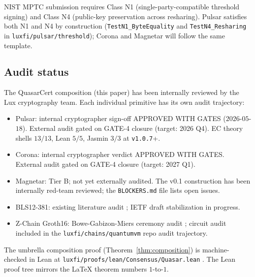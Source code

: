 NIST MPTC submission requires Class N1 (single-party-compatible
threshold signing) and Class N4 (public-key preservation across
resharing). Pulsar satisfies both N1 and N4 by construction
(\texttt{TestN1\_ByteEquality} and \texttt{TestN4\_Resharing} in
\texttt{luxfi/pulsar/threshold}); Corona and Magnetar will follow
the same template.

\subsection{Audit status}

The QuasarCert composition (this paper) has been internally
reviewed by the Lux cryptography team. Each individual primitive
has its own audit trajectory:

\begin{itemize}[leftmargin=2em,nosep]
\item Pulsar: internal cryptographer sign-off APPROVED WITH GATES
      ($2026$-$05$-$18$). External audit gated on GATE-4 closure
      (target: 2026 Q4). EC theory shells $13/13$, Lean $5/5$,
      Jasmin $3/3$ at \texttt{v1.0.7}+.
\item Corona: internal cryptographer verdict APPROVED WITH GATES.
      External audit gated on GATE-4 closure (target: 2027 Q1).
\item Magnetar: Tier B; not yet externally audited. The v0.1
      construction has been internally red-team reviewed; the
      \texttt{BLOCKERS.md} file lists open issues.
\item BLS12-381: existing literature audit
      \cite{boneh2001short,boldyreva2003,bonehshorth}; IETF draft
      stabilization in progress.
\item Z-Chain Groth16: Bowe-Gabizon-Miers ceremony audit
      \cite{bowegabizonmiers}; circuit audit included in the
      \texttt{luxfi/chains/quantumvm} repo audit trajectory.
\end{itemize}

The umbrella composition proof (Theorem~\ref{thm:composition}) is
machine-checked in Lean at \texttt{luxfi/proofs/lean/Consensus/Quasar.lean}
\cite{quasarcertsoundness}. The Lean proof tree mirrors the LaTeX
theorem numbers $1$-to-$1$.
